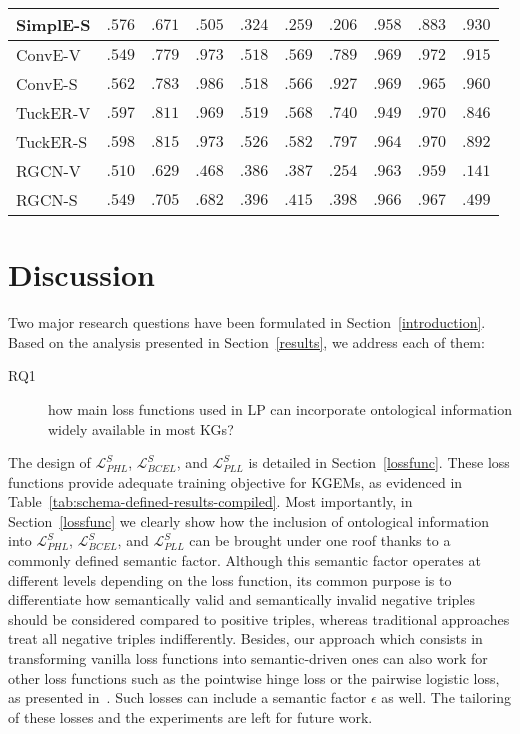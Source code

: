 \documentclass[letterpaper]{article} %
\begin{document}
\begin{table*}
\begin{tabular}{lccccccccc}
                SimplE-S &
    $\mathbf{.576}$&$\mathbf{.671}$&$\mathbf{.505}$& 
    $.324$&$.259$&$.206$& 
    $.958$&$\mathbf{.883}$&$.930$ \\
    \hline
				ConvE-V &
    $.549$&$.779$&$.973$& $.518$&$\mathbf{.569}$&$.789$& $.969$&$\mathbf{.972}$&$.915$ \\
				ConvE-S &
    $\mathbf{.562}$&$\mathbf{.783}$&$\mathbf{.986}$& 
    $.518$&$.566$&$\mathbf{.927}$& 
    $.969$&$.965$&$\mathbf{.960}$  \\
    \hline
    			TuckER-V &
    $.597$&$.811$&$.969$& $.519$&$.568$&$.740$& $.949$&$.970$&$.846$ \\
                TuckER-S &
    $\mathbf{.598}$&$\mathbf{.815}$&$\mathbf{.973}$& 
    $\mathbf{.526}$&$\mathbf{.582}$&$\mathbf{.797}$& 
    $\mathbf{.964}$&$.970$&$\mathbf{.892}$ \\
    \hline
                RGCN-V &
    $.510$&$.629$&$.468$& $.386$&$.387$&$.254$& $.963$&$.959$&$.141$ \\
                RGCN-S &
    $\mathbf{.549}$&$\mathbf{.705}$&$\mathbf{.682}$& 
    $\mathbf{.396}$&$\mathbf{.415}$&$\mathbf{.398}$& 
    $\mathbf{.966}$&$\mathbf{.967}$&$\mathbf{.499}$ \\
    \hline
			\end{tabular}
 \end{table*}

\section{Discussion}\label{discussion}
Two major research questions have been formulated in Section~\ref{introduction}. Based on the analysis presented in Section~\ref{results}, we address each of them:
\begin{description}
    \item[RQ1] how main loss functions used in LP can incorporate ontological information widely available in most KGs? 
\end{description}
The design of $\mathcal{L}^{S}_{PHL}$, $\mathcal{L}^{S}_{BCEL}$, and $\mathcal{L}^{S}_{PLL}$ is detailed in Section~\ref{lossfunc}. These loss functions provide adequate training objective for KGEMs, as evidenced in Table~\ref{tab:schema-defined-results-compiled}. Most importantly, in Section~\ref{lossfunc} we clearly show how the inclusion of ontological information into $\mathcal{L}^{S}_{PHL}$, $\mathcal{L}^{S}_{BCEL}$, and $\mathcal{L}^{S}_{PLL}$ can be brought under one roof thanks to a commonly defined semantic factor. Although this semantic factor operates at different levels depending on the loss function, its common purpose is to differentiate how semantically valid and semantically invalid negative triples should be considered compared to positive triples, whereas traditional approaches treat all negative triples indifferently.
Besides, our approach which consists in transforming vanilla loss functions into semantic-driven ones can also work for other loss functions such as the pointwise hinge loss or the pairwise logistic loss, as presented in~\cite{mohamed2019}. Such losses can include a semantic factor $\epsilon$ as well. The tailoring of these losses and the experiments are left for future work.
\end{document}
